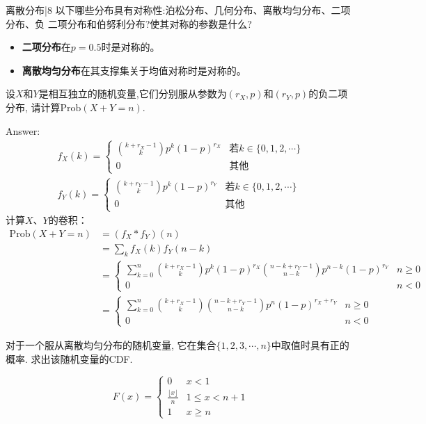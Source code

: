 \newChapter 离散分布|8
\exer 以下哪些分布具有对称性:泊松分布、几何分布、离散均匀分布、二项分布、负 二项分布和伯努利分布?使其对称的参数是什么?
\begin{itemize}
\item {\bf 二项分布}在$p=0.5$时是对称的。
\item {\bf 离散均匀分布}在其支撑集关于均值对称时是对称的。
\end{itemize}

\exer 设$X$和$Y$是相互独立的随机变量,它们分别服从参数为$(r_X,p)$和$(r_Y, p)$的负二项分布, 请计算$\mathrm{Prob}(X + Y = n)$.\par
Answer: 
\begin{gather*}
f_X(k) = \begin{cases}
\binom{k+{r_X}-1}{k}p^k(1-p)^{r_X} & \text{若}k\in\{0,1,2,\cdots\} \\
0 & \text{其他}
\end{cases} \\
f_Y(k) = \begin{cases}
\binom{k+{r_Y}-1}{k}p^k(1-p)^{r_Y} & \text{若}k\in\{0,1,2,\cdots\} \\
0 & \text{其他}
\end{cases} 
\end{gather*}
计算$X$、$Y$的卷积：
\begin{align*}
\mathrm{Prob}(X+Y=n)&=(f_X*f_Y)(n) \\
&=\sum_k f_X(k)f_Y(n-k) \\
&=\begin{cases}
    \sum\limits_{k=0}^n \binom{k+{r_X}-1}{k}p^k(1-p)^{r_X}\binom{n-k+{r_Y}-1}{n-k}p^{n-k}(1-p)^{r_Y} & n\ge0 \\
    0 & n < 0
\end{cases} \\
&=\begin{cases}
    \sum\limits_{k=0}^n \binom{k+{r_X}-1}{k}\binom{n-k+{r_Y}-1}{n-k}p^{n}(1-p)^{r_X+r_Y} & n\ge0 \\
    0 & n < 0
\end{cases}
\end{align*}

\exer 对于一个服从离散均匀分布的随机变量, 它在集合$\{1, 2, 3, \cdots, n\}$中取值时具有正的概率. 求出该随机变量的CDF.\par
\[F(x)=\begin{cases}
0 & x < 1 \\
\frac{\lfloor x \rfloor}{n} &  1\le x < n+1\\
1 & x \ge n
\end{cases}\]

